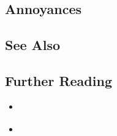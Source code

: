 \subsection[Annoyances]{Annoyances}\label{annoyances}

\hspace*{\fill}

\subsection[See Also]{See Also}\label{see-also}

\hspace*{\fill}

\subsection[Further Reading]{Further Reading}\label{further-reading}

\begin{itemize}
\item{\cite{meyers15b}}
\item{\cite{fluentcpp}}
\end{itemize}


